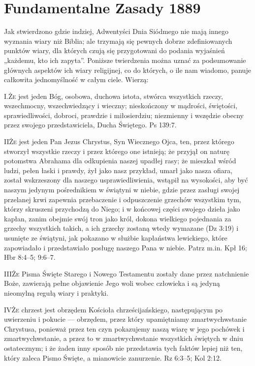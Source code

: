  \label{chap:appendix} 


\section*{Fundamentalne Zasady 1889}

Jak stwierdzono gdzie indziej, Adwentyści Dnia Siódmego nie mają innego wyznania wiary niż Biblia; ale trzymają się pewnych dobrze zdefiniowanych punktów wiary, dla których czują się przygotowani do podania wyjaśnień „każdemu, kto ich zapyta”. Poniższe twierdzenia można uznać za podsumowanie głównych aspektów ich wiary religijnej, co do których, o ile nam wiadomo, panuje całkowita jednomyślność w całym ciele. Wierzą:

\lettrine{I.}{Że} jest jeden Bóg, osobowa, duchowa istota, stwórca wszystkich rzeczy, wszechmocny, wszechwiedzący i wieczny; nieskończony w mądrości, świętości, sprawiedliwości, dobroci, prawdzie i miłosierdziu; niezmienny i wszędzie obecny przez swojego przedstawiciela, Ducha Świętego. Ps 139:7.

\lettrine{II}{Że} jest jeden Pan Jezus Chrystus, Syn Wiecznego Ojca, ten, przez którego stworzył wszystkie rzeczy i przez którego one istnieją; że przyjął on naturę potomstwa Abrahama dla odkupienia naszej upadłej rasy; że mieszkał wśród ludzi, pełen łaski i prawdy, żył jako nasz przykład, umarł jako nasza ofiara, został wskrzeszony dla naszego usprawiedliwienia, wstąpił na wysokości, aby być naszym jedynym pośrednikiem w świątyni w niebie, gdzie przez zasługi swojej przelanej krwi zapewnia przebaczenie i odpuszczenie grzechów wszystkim tym, którzy skruszeni przychodzą do Niego; i w końcowej części swojego dzieła jako kapłan, zanim obejmie swój tron jako król, dokona wielkiego pojednania za grzechy wszystkich takich, a ich grzechy zostaną wtedy wymazane (Dz 3:19) i usunięte ze świątyni, jak pokazano w służbie kapłaństwa lewickiego, które zapowiadało i przedstawiało posługę naszego Pana w niebie. Patrz m.in. Kpł 16; Hbr 8:4--5; 9:6--7.

\lettrine{III}{Że} Pisma Święte Starego i Nowego Testamentu zostały dane przez natchnienie Boże, zawierają pełne objawienie Jego woli wobec człowieka i są jedyną nieomylną regułą wiary i praktyki.

\lettrine{IV}{Że} chrzest jest obrzędem Kościoła chrześcijańskiego, następującym po uwierzeniu i pokucie — obrzędem, przez który upamiętniamy zmartwychwstanie Chrystusa, ponieważ przez ten czyn pokazujemy naszą wiarę w jego pochówek i zmartwychwstanie, a przez to w zmartwychwstanie wszystkich świętych w dniu ostatecznym; i że żaden inny sposób nie przedstawia tych faktów lepiej niż ten, który zaleca Pismo Święte, a mianowicie zanurzenie. Rz 6:3--5; Kol 2:12.

